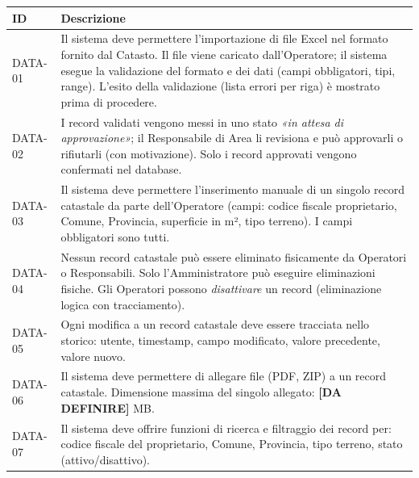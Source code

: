 \documentclass[12pt, a4paper]{article}
\begin{document}
\begin{longtable}{@{}p{2.5cm}p{9.5cm}@{}}
  \toprule
  \textbf{ID} & \textbf{Descrizione} \\
  \midrule
  \endhead

  DATA-01 &
  Il sistema deve permettere l'importazione di file Excel nel formato fornito dal Catasto.
  Il file viene caricato dall'Operatore; il sistema esegue la validazione del formato e dei
  dati (campi obbligatori, tipi, range). L'esito della validazione (lista errori per riga)
  è mostrato prima di procedere. \\[6pt]

  DATA-02 &
  I record validati vengono messi in uno stato \textit{«in attesa di approvazione»};
  il Responsabile di Area li revisiona e può approvarli o rifiutarli (con motivazione).
  Solo i record approvati vengono confermati nel database. \\[6pt]

  DATA-03 &
  Il sistema deve permettere l'inserimento manuale di un singolo record catastale da parte
  dell'Operatore (campi: codice fiscale proprietario, Comune, Provincia, superficie in m²,
  tipo terreno). I campi obbligatori sono tutti. \\[6pt]

  DATA-04 &
  Nessun record catastale può essere eliminato fisicamente da Operatori o Responsabili.
  Solo l'Amministratore può eseguire eliminazioni fisiche. Gli Operatori possono
  \textit{disattivare} un record (eliminazione logica con tracciamento). \\[6pt]

  DATA-05 &
  Ogni modifica a un record catastale deve essere tracciata nello storico: utente,
  timestamp, campo modificato, valore precedente, valore nuovo. \\[6pt]

  DATA-06 &
  Il sistema deve permettere di allegare file (PDF, ZIP) a un record catastale.
  Dimensione massima del singolo allegato: \textbf{[DA DEFINIRE]} MB. \\[6pt]

  DATA-07 &
  Il sistema deve offrire funzioni di ricerca e filtraggio dei record per:
  codice fiscale del proprietario, Comune, Provincia, tipo terreno, stato (attivo/disattivo). \\

  \bottomrule
\end{longtable}

\end{document}
